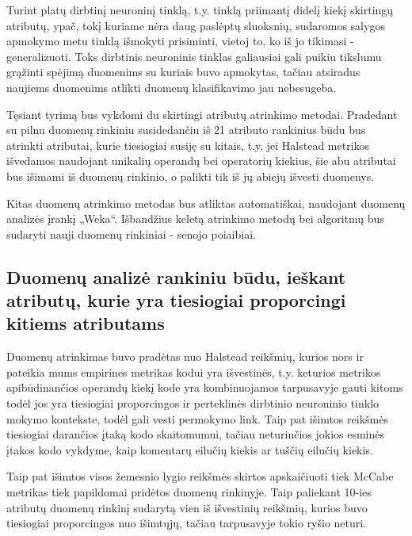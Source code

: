 \documentclass{VUMIFPSbakalaurinis}
\begin{document}
Turint platų dirbtinį neuroninį tinklą, t.y. tinklą priimantį didelį kiekį skirtingų atributų, ypač, tokį kuriame nėra daug paslėptų sluoksnių, sudaromos salygos apmokymo metu tinklą išmokyti prisiminti, vietoj to, ko iš jo tikimasi - generalizuoti. Toks dirbtinis neuroninis tinklas galiausiai gali puikiu tikslumu grąžinti spėjimą duomenims su kuriais buvo apmokytas, tačiau atsiradus naujiems duomenims atlikti duomenų klasifikavimo jau nebesugeba.

Tęsiant tyrimą bus vykdomi du skirtingi atributų atrinkimo metodai. Pradedant su pilnu duomenų rinkiniu susidedančiu iš 21 atributo rankinius būdu bus atrinkti atributai, kurie tiesiogiai susiję su kitais, t.y. jei Halstead metrikos išvedamos naudojant unikalių operandų bei operatorių kiekius, šie abu atributai bus išimami iš duomenų rinkinio, o palikti tik iš jų abiejų išvesti duomenys.

Kitas duomenų atrinkimo metodas bus atliktas automatiškai, naudojant duomenų analizės įrankį „Weka“. Išbandžius keletą atrinkimo metodų bei algoritmų bus sudaryti nauji duomenų rinkiniai - senojo poiaibiai.

\subsection{Duomenų analizė rankiniu būdu, ieškant atributų, kurie yra tiesiogiai proporcingi kitiems atributams}

Duomenų atrinkimas buvo pradėtas nuo Halstead reikšmių, kurios nors ir pateikia mums empirines metrikas kodui yra išvestinės, t.y. keturios metrikos apibūdinančios operandų kiekį kode yra kombinuojamos tarpusavyje gauti kitoms todėl jos yra tiesiogiai proporcingos ir perteklinės dirbtinio neuroninio tinklo mokymo kontekste, todėl gali vesti permokymo link. Taip pat išimtos reikšmės tiesiogiai darančios įtaką kodo skaitomumui, tačiau neturinčios jokios esminės įtakos kodo vykdyme, kaip komentarų eilučių kiekis ar tuščių eilučių kiekis.

Taip pat išimtos visos žemesnio lygio reikšmės skirtos apskaičiuoti tiek McCabe metrikas tiek papildomai pridėtos duomenų rinkinyje. Taip paliekant 10-ies atributų duomenų rinkinį sudarytą vien iš išvestinių reikšmių, kurios buvo tiesiogiai proporcingos nuo išimtųjų, tačiau tarpusavyje tokio ryšio neturi.
\end{document}
